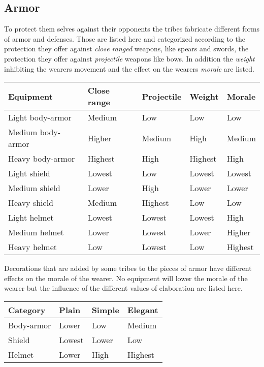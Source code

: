 \subsection{Armor}\label{ch:Goods:Armory:Armor}
To protect them selves against their opponents the tribes fabricate different
forms of armor and defenses. Those are listed here and categorized according to
the protection they offer against \emph{close ranged} weapons, like spears and
swords, the protection they offer against \emph{projectile} weapons like bows.
In addition the \emph{weight} inhibiting the wearers movement and the effect on
the wearers \emph{morale} are listed.

\begin{longtable}{lllll}
	\toprule
	Equipment
	 & Close range & Projectile & Weight  & Morale  \\
	\midrule
	Light body-armor
	 & Medium      & Low        & Low     & Low     \\
	Medium body-armor
	 & Higher      & Medium     & High    & Medium  \\
	Heavy body-armor
	 & Highest     & High       & Highest & High    \\
	\midrule
	Light shield
	 & Lowest      & Low        & Lowest  & Lowest  \\
	Medium shield
	 & Lower       & High       & Lower   & Lower   \\
	Heavy shield
	 & Medium      & Highest    & Low     & Low     \\
	\midrule
	Light helmet
	 & Lowest      & Lowest     & Lowest  & High    \\
	Medium helmet
	 & Lower       & Lowest     & Lower   & Higher  \\
	Heavy helmet
	 & Low         & Lowest     & Low     & Highest \\
	\bottomrule
\end{longtable}

Decorations that are added by some tribes to the pieces of armor have different
effects on the morale of the wearer. No equipment will lower the morale of the
wearer but the influence of the different values of elaboration are listed
here.

\begin{longtable}{llll}
	\toprule
	Category   & Plain  & Simple & Elegant \\
	\midrule
	Body-armor & Lower  & Low    & Medium  \\
	Shield     & Lowest & Lower  & Low     \\
	Helmet     & Lower  & High   & Highest \\
	\bottomrule
\end{longtable}

